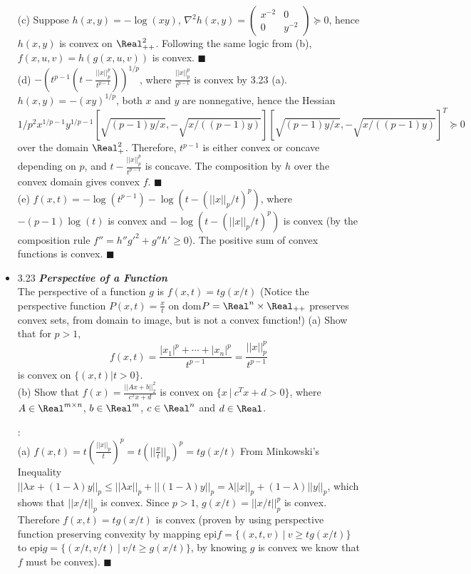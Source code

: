 \begin{itemize}
   (c) Suppose $h(x,y) = -\log(xy)$, $\nabla^2 h(x,y) = \begin{pmatrix} x^{-2} & 0 \\ 0 & y^{-2}
\end{pmatrix} \succeq 0$, hence $h(x,y)$ is convex on $\Real_{++}^2$.  Following the same logic from
(b), $f(x,u,v)=h(g(x,u,v))$ is convex. $\blacksquare$ \\


   (d) $-(t^{p-1}(t - \frac{||x||_p^p}{t^{p-1}}))^{1/p}$, where $\frac{||x||_p^p}{t^{p-1}}$ is
convex by 3.23 (a).  $h(x,y) = -(xy)^{1/p}$, both $x$ and $y$ are nonnegative, hence the Hessian
\begin{equation*} 1/p^2 x^{1/p-1}y^{1/p-1} [\sqrt{(p-1)y/x}, -\sqrt{x/((p-1)y)}][\sqrt{(p-1)y/x},
-\sqrt{x/((p-1)y)}]^T \succeq 0 \end{equation*} over the domain $\Real_+^2$.  Therefore, $t^{p-1}$
is either convex or concave depending on $p$, and $t - \frac{||x||_p^p}{t^{p-1}}$ is concave.  The
composition by $h$ over the convex domain gives convex $f$. $\blacksquare$ \\

   (e) $f(x,t) = -\log(t^{p-1}) - \log(t - (||x||_p/t)^p)$, where $-(p-1)\log(t)$ is convex and
$-\log(t - (||x||_p/t)^p)$ is convex (by the composition rule $f'' = h''g'^2 + g''h' \ge 0$).  The
positive sum of convex functions is convex. $\blacksquare$ \\
       

\item 3.23 {\bf\emph{Perspective of a Function}} \\ The perspective of a function $g$ is $f(x,t) =
tg(x/t)$ (Notice the perspective function $P(x,t) = \frac{x}{t}$ on dom$P = \Real^n \times
\Real_{++}$ preserves convex sets, from domain to image, but is not a convex function!) (a) Show
that for $p>1$, 
\begin{equation} 
f(x,t) = \frac{|x_1|^p + \cdots + |x_n|^p}{t^{p-1}} = \frac{||x||_p^p}{t^{p-1}} 
\end{equation} 
is convex on $\{ (x,t) | t>0 \}$. \\ (b) Show that $f(x) =
\frac{||Ax + b||_2^2}{c^Tx + d}$ is convex on $\{x \ | \ c^T x + d > 0 \}$, where $A \in
\Real^{m\times n}$, $b \in \Real^m$, $c \in \Real^n$ and $d \in \Real$.

 
   \Proof: \\ (a) $f(x,t) = t(\frac{||x||_p}{t})^p = t(||\frac{x}{t}||_p)^p = tg(x/t)$ From
Minkowski's Inequality $||\lambda x + (1-\lambda) y||_p \le ||\lambda x||_p + ||(1-\lambda)y||_p =
\lambda||x||_p + (1-\lambda)||y||_p$, which shows that $||x/t||_p$ is convex.  Since $p>1$, $g(x/t)
= ||x/t||_p^p$ is convex.  Therefore $f(x,t) = tg(x/t)$ is convex (proven by using perspective
function preserving convexity by mapping epi$f = \{(x,t,v) \ | \ v \ge tg(x/t) \}$ to epi$g = \{
(x/t,v/t) \ | \ v/t \ge g(x/t) \}$, by knowing $g$ is convex we know that $f$ must be convex).
$\blacksquare$ \\


\end{itemize}
